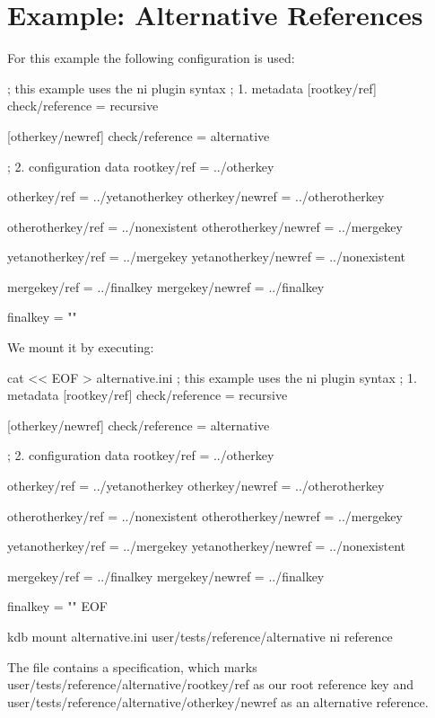 \hypertarget{md_src_plugins_reference_examples_alternative_README_src_plugins_reference_examples_alternative_README_md}{}\section{Example\+: Alternative References}\label{md_src_plugins_reference_examples_alternative_README_src_plugins_reference_examples_alternative_README_md}
For this example the following configuration is used\+:


\begin{DoxyCode}
; this example uses the ni plugin syntax
; 1. metadata
[rootkey/ref]
check/reference = recursive

[otherkey/newref]
check/reference = alternative

; 2. configuration data
rootkey/ref = ../otherkey

otherkey/ref = ../yetanotherkey
otherkey/newref = ../otherotherkey

otherotherkey/ref = ../nonexistent
otherotherkey/newref = ../mergekey

yetanotherkey/ref = ../mergekey
yetanotherkey/newref = ../nonexistent

mergekey/ref = ../finalkey
mergekey/newref = ../finalkey

finalkey = ""
\end{DoxyCode}


We mount it by executing\+:


\begin{DoxyCode}
cat << EOF > alternative.ini
; this example uses the ni plugin syntax
; 1. metadata
[rootkey/ref]
check/reference = recursive

[otherkey/newref]
check/reference = alternative

; 2. configuration data
rootkey/ref = ../otherkey

otherkey/ref = ../yetanotherkey
otherkey/newref = ../otherotherkey

otherotherkey/ref = ../nonexistent
otherotherkey/newref = ../mergekey

yetanotherkey/ref = ../mergekey
yetanotherkey/newref = ../nonexistent

mergekey/ref = ../finalkey
mergekey/newref = ../finalkey

finalkey = ""
EOF

kdb mount alternative.ini user/tests/reference/alternative ni reference
\end{DoxyCode}


The file contains a specification, which marks {\ttfamily user/tests/reference/alternative/rootkey/ref} as our root reference key and {\ttfamily user/tests/reference/alternative/otherkey/newref} as an alternative reference.

